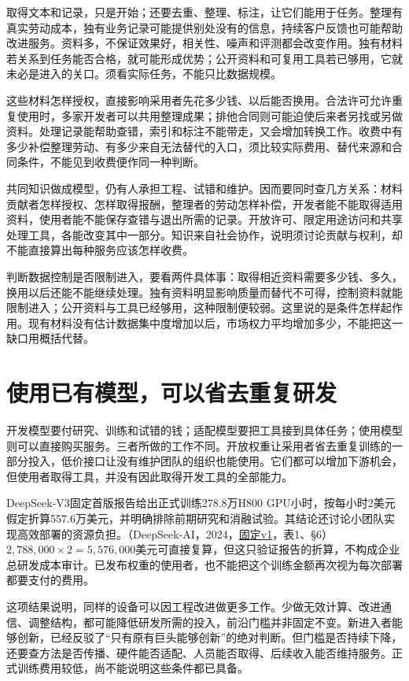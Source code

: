 \documentclass[UTF8,fontset=windows,12pt,a4paper,oneside,openany]{ctexbook}
\begin{document}
取得文本和记录，只是开始；还要去重、整理、标注，让它们能用于任务。整理有真实劳动成本，独有业务记录可能提供别处没有的信息，持续客户反馈也可能帮助改进服务。资料多，不保证效果好，相关性、噪声和评测都会改变作用。独有材料若关系到任务能否合格，就可能形成优势；公开资料和可复用工具若已够用，它就未必是进入的关口。须看实际任务，不能只比数据规模。

这些材料怎样授权，直接影响采用者先花多少钱、以后能否换用。合法许可允许重复使用时，多家开发者可以共用整理成果；排他合同则可能迫使后来者另找或另做资料。处理记录能帮助查错，索引和标注不能带走，又会增加转换工作。收费中有多少补偿整理劳动、有多少来自无法替代的入口，须比较实际费用、替代来源和合同条件，不能见到收费便作同一种判断。

共同知识做成模型，仍有人承担工程、试错和维护。因而要同时查几方关系：材料贡献者怎样授权、怎样取得报酬，整理者的劳动怎样补偿，开发者能不能取得适用资料，使用者能不能保存查错与退出所需的记录。开放许可、限定用途访问和共享处理工具，各能改变其中一部分。知识来自社会协作，说明须讨论贡献与权利，却不能直接算出每种服务应该怎样收费。

判断数据控制是否限制进入，要看两件具体事：取得相近资料需要多少钱、多久，换用以后还能不能继续处理。独有资料明显影响质量而替代不可得，控制资料就能限制进入；公开资料与工具已经够用，这种限制便较弱。这里说的是条件怎样起作用。现有材料没有估计数据集中度增加以后，市场权力平均增加多少，不能把这一缺口用概括代替。

\section{使用已有模型，可以省去重复研发}

开发模型要付研究、训练和试错的钱；适配模型要把工具接到具体任务；使用模型则可以直接购买服务。三者所做的工作不同。开放权重让采用者省去重复训练的一部分投入，低价接口让没有维护团队的组织也能使用。它们都可以增加下游机会，但使用者取得工具，并没有因此取得开发工具的全部能力。

DeepSeek-V3固定首版报告给出正式训练278.8万H800 GPU小时，按每小时2美元假定折算557.6万美元，并明确排除前期研究和消融试验。其结论还讨论小团队实现高效部署的资源负担。（DeepSeek-AI，2024，\href{https://arxiv.org/pdf/2412.19437v1}{固定v1}，表1、§6）$2{,}788{,}000\times2=5{,}576{,}000$美元可直接复算，但这只验证报告的折算，不构成企业总研发成本审计。已发布权重的使用者，也不能把这个训练金额再次视为每次部署都要支付的费用。

这项结果说明，同样的设备可以因工程改进做更多工作。少做无效计算、改进通信、调整结构，都可能降低研发所需的投入，前沿门槛并非固定不变。新进入者能够创新，已经反驳了“只有原有巨头能够创新”的绝对判断。但门槛是否持续下降，还要查方法是否传播、硬件能否适配、人员能否取得、后续收入能否维持服务。正式训练费用较低，尚不能说明这些条件都已具备。
\end{document}
